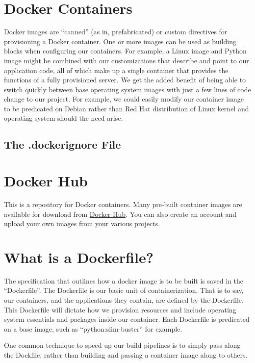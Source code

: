 \section{Docker Containers}

\justify{}
Docker images are ``canned'' (as in, prefabricated) or custom directives for provisioning a Docker container. One or more
images can be used as building blocks when configuring our containers. For example, a Linux image and Python image might
be combined with our customizations that describe and point to our application code, all of which make up a single container
that provides the functions of a fully provisioned server. We get the added
benefit of being able to switch quickly between base operating system images with just a few lines of code change to our
project. For example, we could easily modify our container image to be predicated on Debian
rather than Red Hat distribution of Linux kernel and operating system should the need arise.

\subsection{The .dockerignore File}

\section{Docker Hub}

\justify{}
This is a repository for Docker containers. Many pre-built container images are available for download
from \href{https://hub.docker.com/}{Docker Hub}. You can also create an account and upload your own images from your various
projects.

\section{What is a Dockerfile?}

\justify{}
The specification that outlines how a docker image is to be built is saved in the ``Dockerfile''.
The Dockerfile is our basic unit of containerization. That is to say,
our containers, and the applications they contain, are defined by the
Dockerfile. This Dockerfile will dictate how we provision resources and
include operating system essentials and packages inside our container.
Each Dockerfile is predicated on a base image, such as ``python:slim-buster''
for example.

\justify{}
One common technique to speed up our build pipelines is to simply pass along the Dockfile, rather than
building and passing a container image along to others.

